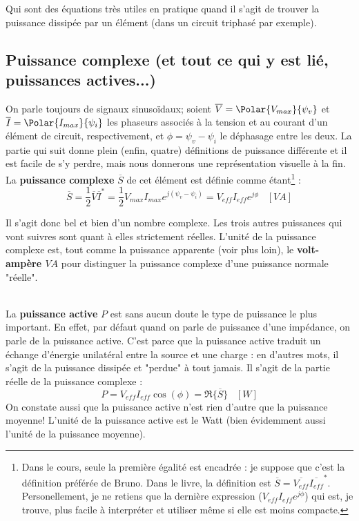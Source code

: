 Qui sont des équations très utiles en pratique quand il s'agit de trouver la puissance dissipée par un élément (dans un circuit triphasé par exemple).

\subsection{Puissance complexe (et tout ce qui y est lié, puissances actives...)}
On parle toujours de signaux sinusoïdaux; soient $\overline{V} = \Polar{V_{max}}{\psi_v}$ et $\overline{I} = \Polar{I_{max}}{\psi_i}$ les phaseurs associés à la tension et au courant d'un élément de circuit, respectivement, et $\phi = \psi_v - \psi_i$ le déphasage entre les deux. La partie qui suit donne plein (enfin, quatre) définitions de puissance différente et il est facile de s'y perdre, mais nous donnerons une représentation visuelle à la fin.
\hspace{0pt} \\
La \textbf{puissance complexe} $\overline{S}$ de cet élément est définie comme étant\footnote{Dans le cours, seule la première égalité est encadrée : je suppose que c'est la définition préférée de Bruno. Dans le livre, la définition est $\overline{S} = \overline{V_{eff}}\overline{I_{eff}}^*$. Personellement, je ne retiens que la dernière expression ($V_{eff}I_{eff}e^{j\phi}$) qui est, je trouve, plus facile à interpréter et utiliser même si elle est moins compacte.} :
\begin{equation}
\overline{S} = \frac{1}{2} \overline{V}\overline{I}^* = \frac{1}{2}V_{max}I_{max}e^{j(\psi_v - \psi_i)} = V_{eff}I_{eff}e^{j\phi} \; \; \; [VA]
\end{equation}

Il s'agit donc bel et bien d'un nombre complexe. Les trois autres puissances qui vont suivres sont quant à elles strictement réelles. L'unité de la puissance complexe est, tout comme la puissance apparente (voir plus loin), le \textbf{volt-ampère $VA$} pour distinguer la puissance complexe d'une puissance normale "réelle".

\hspace{0pt} \\
La \textbf{puissance active} $P$ est sans aucun doute le type de puissance le plus important. En effet, par défaut quand on parle de puissance d'une impédance, on parle de la puissance active. C'est parce que la puissance active traduit un échange d'énergie unilatéral entre la source et une charge : en d'autres mots, il s'agit de la puissance dissipée et "perdue" à tout jamais. Il s'agit de la partie réelle de la puissance complexe :
\begin{equation}
P = V_{eff}I_{eff}\cos(\phi) = \Re\{\overline{S}\} \; \; \; [W]
\end{equation}
On constate aussi que la puissance active n'est rien d'autre que la puissance moyenne! L'unité de la puissance active est le Watt (bien évidemment aussi l'unité de la puissance moyenne).

